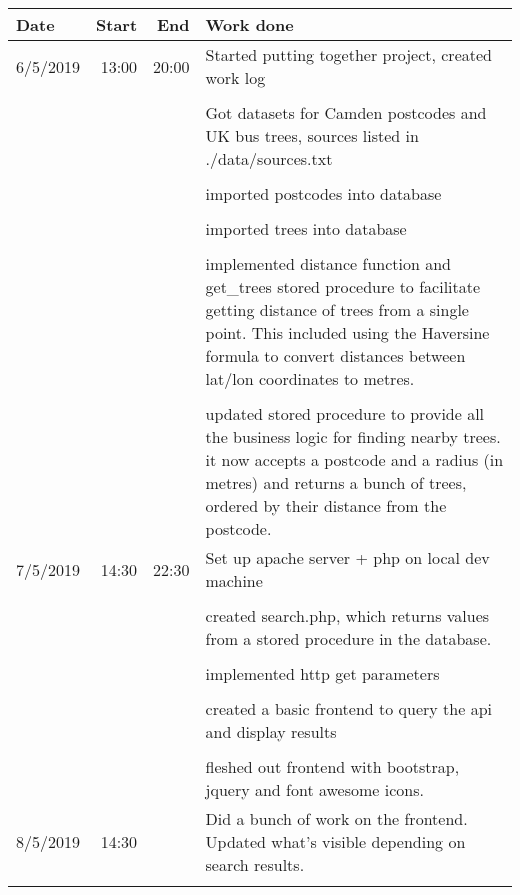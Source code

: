 \documentclass{article}
\begin{document}
\begin{table}[h!]
    \begin{tabular}{l|r|r|p{15cm}}  %
        \textbf{Date} & \textbf{Start} & \textbf{End} & \textbf{Work done} \\
        \hline
        6/5/2019    &   13:00   &   20:00   &   Started putting together project, created work log\\
        &   &   &   \\
        &   &                               &   Got datasets for Camden postcodes and UK bus trees, sources listed in ./data/sources.txt \\
        &   &   &   \\
        &   &                               &   imported postcodes into database \\
        &   &   &   \\
        &   &                               &   imported trees into database \\
        &   &   &   \\
        &   &                               &   implemented distance function and get\_trees stored procedure to facilitate getting distance of trees from a single point. This included using the Haversine formula to convert distances between lat/lon coordinates to metres.  \\
        &   &   &   \\
        &   &                               &   updated stored procedure to provide all the business logic for finding nearby trees. it now accepts a postcode and a radius (in metres) and returns a bunch of trees, ordered by their distance from the postcode. \\
        \hline
        7/5/2019    &   14:30   &   22:30   &   Set up apache server + php on local dev machine\\
        &   &   &   \\
        &   &                               &   created search.php, which returns values from a stored procedure in the database.\\
        &   &   &   \\
        &   &                               &   implemented http get parameters\\
        &   &   &   \\
        &   &                               &   created a basic frontend to query the api and display results\\
        &   &   &   \\
        &   &                               &   fleshed out frontend with bootstrap, jquery and font awesome icons.\\
        \hline
        8/5/2019    &   14:30   &           &   Did a bunch of work on the frontend. Updated what's visible depending on search results.\\
        &   &   &   \\
    \end{tabular}
\end{table}
\end{document}
